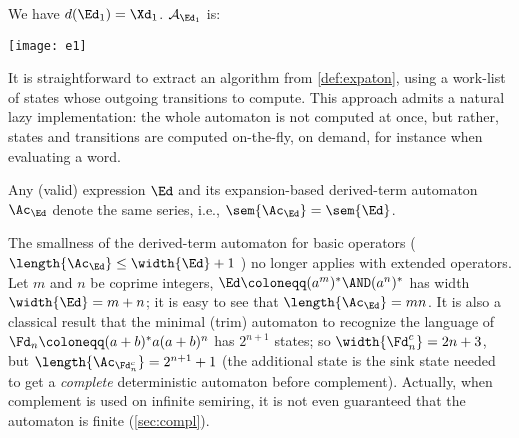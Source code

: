 \documentclass[a4paper,USenglish]{lipics}
\begin{document}
\begin{Example}
  \label{ex:e1:end}
{We have $d(\Ed_1) = \Xd_1$. $\mathcal{A}_{\Ed_1}$ is:}

  \centerline{\texttt{[image: e1]}}
\end{Example}

It is straightforward to extract an algorithm from \cref{def:expaton}, using
a work-list of states whose outgoing transitions to compute.  This approach
admits a natural lazy implementation: the whole automaton is not computed at
once, but rather, states and transitions are computed on-the-fly, on demand,
for instance when evaluating a word.

\begin{theorem}
  \label{thm:expaton}Any (valid) expression $\Ed$ and its expansion-based derived-term
  automaton $\Ac_\Ed$ denote the same series, i.e.,
  $\sem{\Ac_\Ed} = \sem{\Ed}$.
\end{theorem}

The smallness of the derived-term automaton for basic operators
($\length{\Ac_\Ed} \le \width{\Ed} + 1$
\citep[Theorem~2]{lombardy.2005.tcs}) no longer applies with extended
operators.  Let $m$ and $n$ be coprime integers,
$\Ed \coloneqq (a^m)^*\AND (a^n)^*$ has width $\width{\Ed} = m+n$; it is
easy to see that $\length{\Ac_\Ed} = mn$.  It is also a classical result
that the minimal (trim) automaton to recognize the language of
$\Fd_n \coloneqq (a+b)^*a(a+b)^n$ has $2^{n+1}$ states; so
$\width{\Fd_n^{c}} = 2n+3$, but $\length{\Ac_{\Fd_n^{c}}} = 2^{n+1}+1$ (the
additional state is the sink state needed to get a \emph{complete}
deterministic automaton before complement).  Actually, when complement is
used on infinite semiring, it is not even guaranteed that the automaton is
finite (\cref{sec:compl}).
\end{document}
